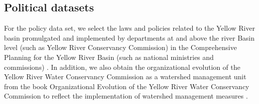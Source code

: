 \documentclass[9pt,twoside,lineno]{pnas-new}
\begin{document}
\subsection*{Political datasets}
For the policy data set, we select the laws and policies related to the Yellow River basin promulgated and implemented by departments at and above the river Basin level (such as Yellow River Conservancy Commission) in the Comprehensive Planning for the Yellow River Basin (such as national ministries and commissions) \cite{yellowriverconservancycommissionYellowRiverBasin2013}. In addition, we also obtain the organizational evolution of the Yellow River Water Conservancy Commission as a watershed management unit from the book Organizational Evolution of the Yellow River Water Conservancy Commission to reflect the implementation of watershed management measures \cite{yellowriverarchivesOrganizationalHistoryYellow2004}.


\newpage
\end{document}
